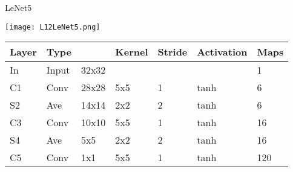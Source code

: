 \documentclass[10pt, table, dvipsnames,xcdraw, handout]{beamer}
\begin{document}
\begin{frame}[fragile]{LeNet5}
  \begin{minipage}[t][0.4\textheight][t]{\textwidth}\centering
	\centering \texttt{[image: L12LeNet5.png]} 
  \end{minipage}
  \vfill
\begin{minipage}[t][0.6\textheight][t]{\textwidth}

\begin{table}[]
\begin{tabular}{|l|l|l|l|l|l|l|}
\hline
\rowcolor[HTML]{656565} 
{\color[HTML]{EFEFEF} Layer} & {\color[HTML]{EFEFEF} Type} & \multicolumn{1}{c|}{\cellcolor[HTML]{656565}{\color[HTML]{EFEFEF} Size}} & {\color[HTML]{EFEFEF} Kernel} & {\color[HTML]{EFEFEF} Stride} & {\color[HTML]{EFEFEF} Activation} & {\color[HTML]{EFEFEF} Maps} \\ \hline
In                           & Input                       & 32x32                                                                    &                               &                               &                                   & 1                           \\ \hline
C1                           & Conv                        & 28x28                                                                    & 5x5                           & 1                             & tanh                              & 6                           \\ \hline
S2                           & Ave                         & 14x14                                                                    & 2x2                           & 2                             & tanh                              & 6                           \\ \hline
C3                           & Conv                        & 10x10                                                                    & 5x5                           & 1                             & tanh                              & 16                          \\ \hline
S4                           & Ave                         & 5x5                                                                      & 2x2                           & 2                             & tanh                              & 16                          \\ \hline
C5                           & Conv                        & 1x1                                                                      & 5x5                           & 1                             & tanh                              & 120                         \\ \hline

\end{tabular}
\end{table}
\end{minipage}
\end{frame}
\end{document}
